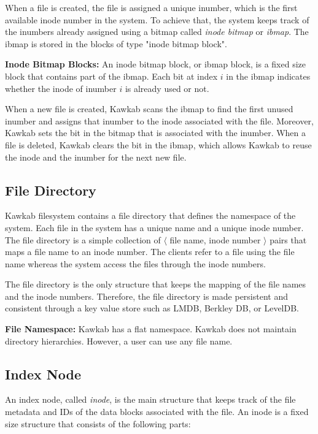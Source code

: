 \documentclass[]{article}
\newcommand{\subtopic}[1]{\vspace{1.5pt} \noindent \textbf{#1}}
\begin{document}
When a file is created, the file is assigned a unique inumber, which
is the first available inode number in the system. To achieve that, the
system keeps track of the inumbers already assigned using a bitmap
called \textit{inode bitmap} or \textit{ibmap}. The ibmap is stored in
the blocks of type "inode bitmap block".


\subtopic{Inode Bitmap Blocks:} An inode bitmap block, or ibmap block,
is a fixed size block that contains part of the ibmap. 
Each bit at index $i$ in the ibmap indicates whether the inode of inumber $i$ 
is already used or not. 

When a new file is created, Kawkab scans the ibmap to find the first unused 
inumber and assigns that inumber to the inode associated with the file. Moreover,
Kawkab sets the bit in the bitmap that is associated with the inumber.
When a file is deleted, Kawkab clears the bit in the ibmap, which allows
Kawkab to reuse the inode and the inumber for the next new file.


\subsection{File Directory} Kawkab filesystem contains a file directory that
defines the namespace of the system.
Each file in the system has a unique name and a unique inode number.  The file
directory is a simple collection of $\langle$ file name, inode number $\rangle$
pairs that maps a file name to an inode number.  The clients refer to a file
using the file name whereas the system access the files through the inode
numbers. 

The file directory is the only structure that keeps the mapping of the file
names and the inode numbers. Therefore, the file directory is made persistent
and consistent through a key value store such as LMDB, Berkley DB, or LevelDB.

\subtopic{File Namespace:} Kawkab has a flat namespace. Kawkab does not maintain
directory hierarchies. However, a user can use any file name.



\subsection{Index Node} An index node, called \textit{inode}, is the main
structure that keeps track of the file metadata and IDs of the data
blocks associated with the file. An inode is a fixed size structure that
consists of the following parts:
\end{document}
